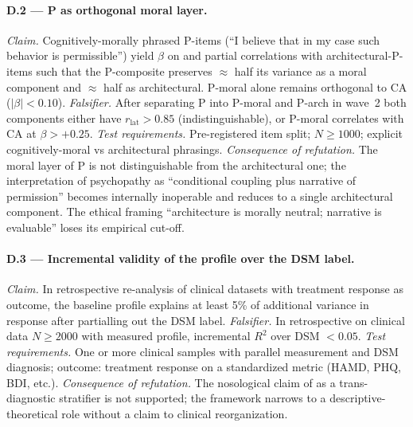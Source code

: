 \paragraph{D.2 --- P as orthogonal moral layer.}
\emph{Claim.} Cognitively-morally phrased P-items (``I believe that in my case such behavior is permissible'') yield $\beta$ on \EAF{} and partial correlations with architectural-P-items such that the P-composite preserves $\approx$ half its variance as a moral component and $\approx$ half as architectural. P-moral alone remains orthogonal to CA ($|\beta| < 0.10$).
\emph{Falsifier.} After separating P into P-moral and P-arch in wave~2 both components either have $r_{\mathrm{lat}} > 0.85$ (indistinguishable), or P-moral correlates with CA at $\beta > +0.25$.
\emph{Test requirements.} Pre-registered item split; $N \geq 1000$; explicit cognitively-moral vs architectural phrasings.
\emph{Consequence of refutation.} The moral layer of P is not distinguishable from the architectural one; the interpretation of psychopathy as ``conditional coupling plus narrative of permission'' becomes internally inoperable and reduces to a single architectural component. The ethical framing ``architecture is morally neutral; narrative is evaluable'' loses its empirical cut-off.

\paragraph{D.3 --- Incremental validity of the \DEIC{} profile over the DSM label.}
\emph{Claim.} In retrospective re-analysis of clinical datasets with treatment response as outcome, the baseline \DEIC{} profile explains at least 5\% of additional variance in response after partialling out the DSM label.
\emph{Falsifier.} In retrospective on clinical data $N \geq 2000$ with measured \DEIC{} profile, incremental $R^2$ over DSM $< 0.05$.
\emph{Test requirements.} One or more clinical samples with parallel \DEIC{} measurement and DSM diagnosis; outcome: treatment response on a standardized metric (HAMD, PHQ, BDI, etc.).
\emph{Consequence of refutation.} The nosological claim of \DEIC{} as a trans-diagnostic stratifier is not supported; the framework narrows to a descriptive-theoretical role without a claim to clinical reorganization.

